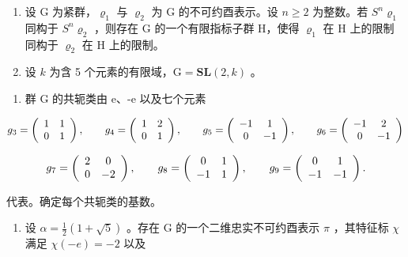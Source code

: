 \begin{enumerate}
\def\labelenumi{\arabic{enumi})}
\setcounter{enumi}{7}
\item
  设 G 为紧群，\(\varrho_{1}\) 与 \(\varrho_{2}\) 为 G 的不可约酉表示。设 \(n \geqslant 2\) 为整数。若 \(S^{n}\varrho_{1}\) 同构于 \(S^{n}\varrho_{2}\) ，则存在 G 的一个有限指标子群 H，使得 \(\varrho_{1}\) 在 H 上的限制同构于 \(\varrho_{2}\) 在 H 上的限制。
\item
  设 \(k\) 为含 5 个元素的有限域，\(\mathrm{G} = \mathbf{S}\mathbf{L}(2,k)\) 。
\end{enumerate}

\begin{enumerate}
\def\labelenumi{\alph{enumi})}
\tightlist
\item
  群 G 的共轭类由 e、-e 以及七个元素
\end{enumerate}

\[
g _ {3} = \left( \begin{array}{c c} 1 & 1 \\ 0 & 1 \end{array} \right), \qquad g _ {4} = \left( \begin{array}{c c} 1 & 2 \\ 0 & 1 \end{array} \right), \qquad g _ {5} = \left( \begin{array}{c c} - 1 & 1 \\ 0 & - 1 \end{array} \right), \qquad g _ {6} = \left( \begin{array}{c c} - 1 & 2 \\ 0 & - 1 \end{array} \right)
\]

\[
g _ {7} = \left( \begin{array}{c c} 2 & 0 \\ 0 & - 2 \end{array} \right), \qquad g _ {8} = \left( \begin{array}{c c} 0 & 1 \\ - 1 & 1 \end{array} \right), \qquad g _ {9} = \left( \begin{array}{c c} 0 & 1 \\ - 1 & - 1 \end{array} \right).
\]

代表。确定每个共轭类的基数。

\begin{enumerate}
\def\labelenumi{\alph{enumi})}
\setcounter{enumi}{1}
\tightlist
\item
  设 \(\alpha = \frac{1}{2}(1 + \sqrt{5})\) 。存在 G 的一个二维忠实不可约酉表示 \(\pi\) ，其特征标 \(\chi\) 满足 \(\chi(-e) = -2\) 以及
\end{enumerate}

